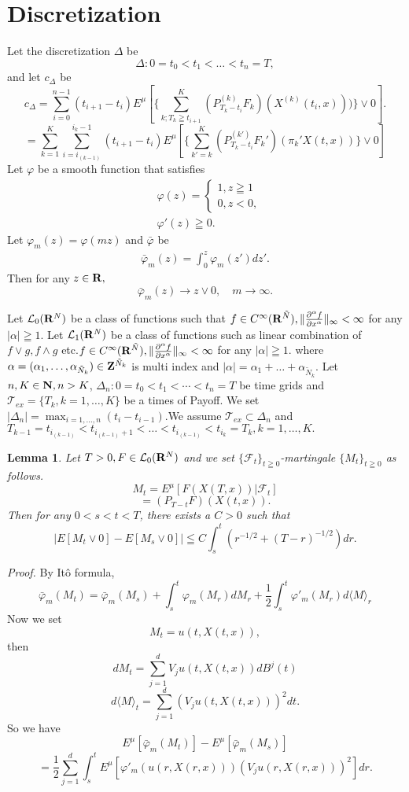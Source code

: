 \documentclass[12pt]{article}
\newtheorem{lem}[thm]{Lemma}%
\begin{document}
\section{Discretization}
Let the discretization $\Delta $ be
$$\Delta: 0=t_0 < t_1 < \ldots < t_n = T,$$
and let $c_{\Delta}$ be
$$c_{\Delta}=\sum_{i=0}^{n-1}(t_{i+1}-t_i)E^{\mu}[\{\sum_{k; T_k \geqq t_{i+1}}^K(P_{T_k-t_i}^{(k)}F_k)(X^{(k)}(t_i,x))) \}\vee 0].
$$
$$
=\sum_{k=1}^K\sum_{i=i_{(k-1)}}^{{i_{k}}-1}(t_{i+1}-t_i) E^{\mu}[ \{\sum_{k'=k}^K(P_{T_k-t_i}^{(k')}F_k')(\pi_k' X(t,x))\}\vee0 ]
 $$
Let $\varphi$ be a smooth function that satisfies
\begin{align*}
&\varphi(z)=
\begin{cases}
1 , z\geqq 1\\
0, z<0,
\end{cases}\\
&\varphi' (z) \geqq 0.
\end{align*}
Let $\varphi_m(z)=\varphi(mz)$ and $\bar{\varphi}$ be 
\begin{align*}
\bar{\varphi}_m(z)=\int_{0}^z \varphi_m(z')dz'.
\end{align*}
Then for any $z \in {\bf R},$
$$\bar{\varphi}_m(z) \to z \vee 0 , \quad m\to \infty.$$

Let $\mathcal{L}_0({\bf R}^N)$ be a class of functions such that 
$f \in C^{\infty}({\bf R}^{\tilde{N}}),\|\frac{\partial^{\alpha}f}{\partial x^{\alpha}}\|_{\infty} <\infty$ for any $|\alpha| \geqq 1.$
Let $\mathcal{L}_1({\bf R}^N)$ be a class of functions such as  linear combination of $f \vee g, f \wedge g$ etc.$f \in C^{\infty}({\bf R}^{\tilde{N}}),\|\frac{\partial^{\alpha}f}{\partial x^{\alpha}}\|_{\infty} <\infty$ for any $|\alpha| \geqq 1.$
where $\alpha=(\alpha_1,\ldots, \alpha_{\tilde{N}_k})\in {\bf Z}^{\tilde{N}_k}$ is multi index and $|\alpha|=\alpha_1+\ldots+ \alpha_{\tilde{N}_k}$.
Let $n, K \in {\bf N}, n> K$,  $\Delta_n: 0 = t_0 < t_1 < \cdots < t_n = T$ be time grids and 
$\mathcal{T}_{ex} = \{T_k, k=1,\ldots,K\}$ be a times of Payoff.
We set $|\Delta_n| = \max_{i=1,\ldots,n}(t_i-t_{i-1})$.We assume $\mathcal{T}_{ex} \subset \Delta_n$ and
$T_{k-1}=t_{i_{(k-1)}} <t_{i_{(k-1)}+1}  < \ldots < t_{i_{(k-1)}} <t_{i_{k}}=T_k, k=1,\ldots, K.$

\begin{lem}\label{discLem2}
Let $T>0, F \in \mathcal{L}_0({\bf R}^N)$ and we set $\{\mathcal{F}_t\}_{t\geqq 0}$-martingale $\{M_t\}_{t\geqq 0}$
as follows.
$$M_t = E^{\mu}[F(X(T,x))|\mathcal{F}_t]$$ 
$$=(P_{T-t}F)(X(t,x)).$$
Then for any $0< s < t< T$, there exists a $C>0$ such that 
$$|E[M_t \vee 0]-E[M_s \vee 0]|\leqq C \int_{s}^t(r^{-1/2}+(T-r)^{-1/2})dr .$$
\end{lem}
{\it Proof.}
By It\^o formula, 
$$\bar{\varphi}_m(M_t)=\bar{\varphi}_m(M_s)+\int_s^t\varphi_m(M_r)dM_r+\frac{1}{2}\int_s^t\varphi'_m(M_r)d\langle M \rangle_r$$
Now we set $$M_t=u(t,X(t,x)),$$ then
$$dM_t=\sum_{j=1}^d V_j u(t,X(t,x))dB^j(t)$$
$$d\langle M \rangle_t=\sum_{j=1}^d (V_j u(t,X(t,x)))^2dt.$$
So we have
$$E^{\mu}[\bar{\varphi}_m(M_t)]-E^{\mu}[\bar{\varphi}_m(M_s)]$$
$$=\frac{1}{2}\sum_{j=1}^d \int_s^t E^{\mu}[\varphi'_m( u(r,X(r,x)) ) (V_j u(r,X(r,x)))^2] dr.$$
\end{document}
